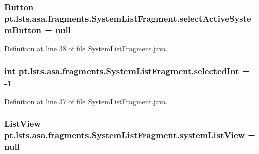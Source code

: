 \subsubsection[{select\+Active\+System\+Button}]{\setlength{\rightskip}{0pt plus 5cm}Button pt.\+lsts.\+asa.\+fragments.\+System\+List\+Fragment.\+select\+Active\+System\+Button = null\hspace{0.3cm}{\ttfamily [private]}}\label{classpt_1_1lsts_1_1asa_1_1fragments_1_1SystemListFragment_a173670a84f396edae24f52fa9919f765}


Definition at line 38 of file System\+List\+Fragment.\+java.

\hypertarget{classpt_1_1lsts_1_1asa_1_1fragments_1_1SystemListFragment_ab3759533393b5cc748d55bd4f77d456a}{}
\subsubsection[{selected\+Int}]{\setlength{\rightskip}{0pt plus 5cm}int pt.\+lsts.\+asa.\+fragments.\+System\+List\+Fragment.\+selected\+Int = -\/1\hspace{0.3cm}{\ttfamily [private]}}\label{classpt_1_1lsts_1_1asa_1_1fragments_1_1SystemListFragment_ab3759533393b5cc748d55bd4f77d456a}


Definition at line 37 of file System\+List\+Fragment.\+java.

\hypertarget{classpt_1_1lsts_1_1asa_1_1fragments_1_1SystemListFragment_a30aa8b6899bb6b1e24349d5cbc93ee98}{}
\subsubsection[{system\+List\+View}]{\setlength{\rightskip}{0pt plus 5cm}List\+View pt.\+lsts.\+asa.\+fragments.\+System\+List\+Fragment.\+system\+List\+View = null\hspace{0.3cm}{\ttfamily [private]}}\label{classpt_1_1lsts_1_1asa_1_1fragments_1_1SystemListFragment_a30aa8b6899bb6b1e24349d5cbc93ee98}


